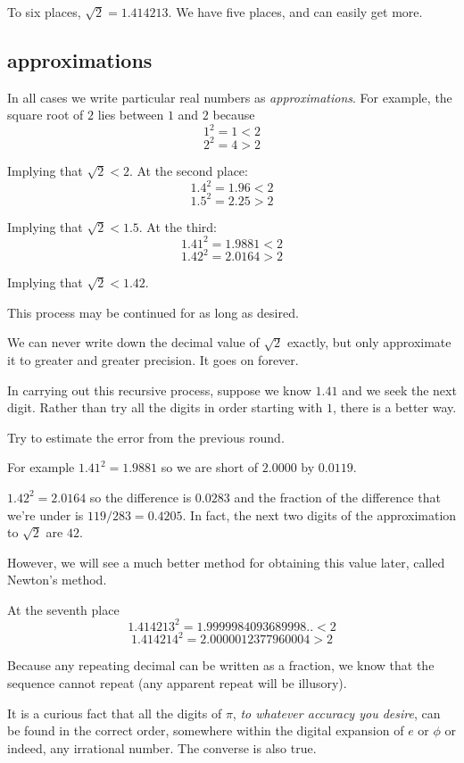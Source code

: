 \documentclass[11pt, oneside]{article}
\begin{document}
To six places, $\sqrt{2} = 1.414213$.  We have five places, and can easily get more.

\subsection*{approximations}

In all cases we write particular real numbers as \emph{approximations}.  For example, the square root of $2$ lies between $1$ and $2$ because
\[ 1^2 = 1 < 2 \]
\[ 2^2 = 4 > 2 \]

Implying that $\sqrt{2} < 2$.  At the second place:
\[ 1.4^2 = 1.96 < 2 \] 
\[1.5^2 = 2.25 > 2 \]

Implying that $\sqrt{2} < 1.5$.  At the third:
\[ 1.41^2 = 1.9881 < 2 \]
\[1.42^2 = 2.0164 > 2 \]

Implying that $\sqrt{2} < 1.42$.  

This process may be continued for as long as desired. 

We can never write down the decimal value of $\sqrt{2}$ exactly, but only approximate it to greater and greater precision.  It goes on forever.

In carrying out this recursive process, suppose we know $1.41$ and we seek the next digit.  Rather than try all the digits in order starting with $1$, there is a better way.

Try to estimate the error from the previous round.  

For example $1.41^2 = 1.9881$ so we are short of $2.0000$ by $0.0119$.  

$1.42^2 = 2.0164$ so the difference is $0.0283$ and the fraction of the difference that we're under is $119/283 = 0.4205$.  In fact, the next two digits of the approximation to $\sqrt{2}$ are $42$.

However, we will see a much better method for obtaining this value later, called Newton's method.

At the seventh place
\[ 1.414213^2 = 1.9999984093689998.. < 2 \]
\[ 1.414214^2 = 2.0000012377960004 > 2 \]

Because any repeating decimal can be written as a fraction, we know that the sequence cannot repeat (any apparent repeat will be illusory).  

It is a curious fact that all the digits of $\pi$, \emph{to whatever accuracy you desire}, can be found in the correct order, somewhere within the digital expansion of $e$ or $\phi$ or indeed, any irrational number.  The converse is also true.
\end{document}
